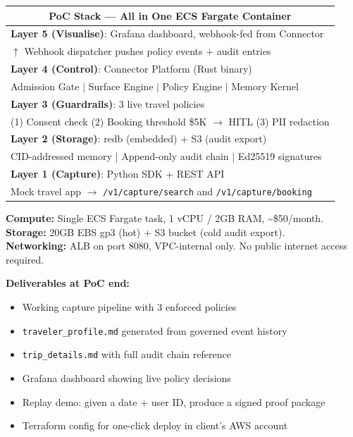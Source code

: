 \documentclass[11pt, a4paper]{article}
\begin{document}
\begin{center}
\begin{tabular}{p{13cm}}
\toprule
\multicolumn{1}{c}{\textbf{PoC Stack --- All in One ECS Fargate Container}} \\
\midrule
\textbf{Layer 5 (Visualise)}: Grafana dashboard, webhook-fed from Connector \\
$\uparrow$ Webhook dispatcher pushes policy events + audit entries \\
\midrule
\textbf{Layer 4 (Control)}: Connector Platform (Rust binary) \\
\quad Admission Gate $|$ Surface Engine $|$ Policy Engine $|$ Memory Kernel \\
\midrule
\textbf{Layer 3 (Guardrails)}: 3 live travel policies \\
\quad (1) Consent check \quad (2) Booking threshold \$5K $\to$ HITL \quad (3) PII redaction \\
\midrule
\textbf{Layer 2 (Storage)}: redb (embedded) + S3 (audit export) \\
\quad CID-addressed memory $|$ Append-only audit chain $|$ Ed25519 signatures \\
\midrule
\textbf{Layer 1 (Capture)}: Python SDK + REST API \\
\quad Mock travel app $\to$ \texttt{/v1/capture/search} and \texttt{/v1/capture/booking} \\
\bottomrule
\end{tabular}
\end{center}

\vspace{0.5em}

\textbf{Compute:} Single ECS Fargate task, 1 vCPU / 2GB RAM, \textasciitilde\$50/month. \\
\textbf{Storage:} 20GB EBS gp3 (hot) + S3 bucket (cold audit export). \\
\textbf{Networking:} ALB on port 8080, VPC-internal only. No public internet access required.

\vspace{0.5em}

\textbf{Deliverables at PoC end:}
\begin{itemize}
  \item Working capture pipeline with 3 enforced policies
  \item \texttt{traveler\_profile.md} generated from governed event history
  \item \texttt{trip\_details.md} with full audit chain reference
  \item Grafana dashboard showing live policy decisions
  \item Replay demo: given a date + user ID, produce a signed proof package
  \item Terraform config for one-click deploy in client's AWS account
\end{itemize}
\end{document}
